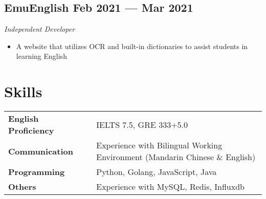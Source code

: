 \documentclass[a4,12pt]{article}
\newcommand{\subtext}[1]{
#1\par\vspace{-0.3cm}}
\newenvironment{zitemize}{
\begin{itemize}\itemsep0pt \parskip0pt \parsep1pt}
{\end{itemize}\vspace{-0.5cm}}
\newcommand{\hskills}[1]{
\textbf{\bfseries #1} }
\begin{document}
\subsection*{EmuEnglish \hfill \textbf{Feb 2021 --- Mar 2021}}
\subtext{\textit{Independent Developer}}
\begin{zitemize}
    \item A website that utilizes OCR and built-in dictionaries to assist students in learning English
\end{zitemize}


\section{\textbf{Skills}}
\begin{tabular}{p{11em} p{1em} p{43em}}
\hskills{English Proficiency} & & IELTS 7.5, GRE 333+5.0 \\
\hskills{Communication} & & Experience with Bilingual Working Environment (Mandarin Chinese \& English)  \\
\hskills{Programming} &  & Python, Golang, JavaScript, Java \\
\hskills{Others} & & Experience with MySQL, Redis, Influxdb
\end{tabular}
\vspace{-0.2cm}





\end{document}
